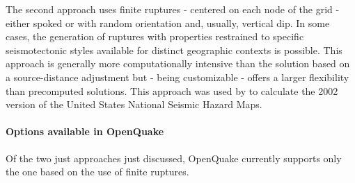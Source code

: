 {The second approach uses finite ruptures - centered on each node 
of the grid - either spoked or with random orientation and,  
usually, vertical dip. 
%
In some cases, the generation of ruptures with properties 
restrained to specific seismotectonic styles available for distinct  
geographic contexts is possible. 
%
This approach is generally more computationally intensive than the 
solution based on a source-distance adjustment but - being 
customizable - offers a larger flexibility than precomputed solutions.
%
This approach was used by \citet{frankel2002} to calculate the 2002
version of the United States National Seismic Hazard Maps.
%
\paragraph{Options available in OpenQuake}
Of the two just approaches just discussed, OpenQuake currently supports 
only the one based on the use of finite ruptures.

}
